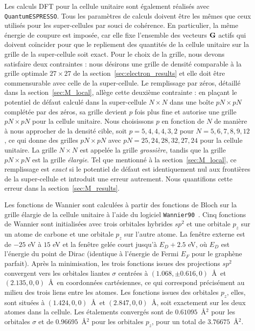 Les calculs DFT pour la cellule unitaire sont également réalisés avec \texttt{QuantumESPRESSO}. Tous les paramètres de calculs doivent être les mêmes que ceux utilisés pour les super-cellules par souci de cohérence. En particulier, la même énergie de coupure est imposée, car elle fixe l'ensemble des vecteurs $\mathbf{G}$ actifs qui doivent coïncider pour que le repliement des quantités de la cellule unitaire sur la grille de la super-cellule soit exact. Pour le choix de la grille, nous devons satisfaire deux contraintes : nous désirons une grille de densité comparable à la grille optimale $27\times27$ de la section~\ref{sec:electron_results} et elle doit être commensurable avec celle de la super-cellule. Le remplissage par zéros, détaillé dans la section~\ref{sec:M_local}, allège cette deuxième contrainte : en
plaçant le potentiel de défaut calculé dans la super-cellule
$N\times N$ dans une boîte $pN\times pN$ complétée par des zéros, sa grille devient $p$ fois plus fine et autorise une grille $pN\times pN$ pour la cellule unitaire. Nous
choisissons $p$ en fonction de $N$ de manière à nous
approcher de la densité cible, soit $p = 5, 4, 4, 4, 3, 2$ pour $N = 5, 6, 7, 8, 9, 12$, ce qui donne des grilles $pN\times pN$ avec $pN = 25, 24, 28, 32, 27, 24$ pour la cellule unitaire. La grille $N\times N$ est appelée la grille \textit{grossière}, tandis que la grille $pN\times pN$ est la grille \textit{élargie}. Tel que mentionné à la section~\ref{sec:M_local}, ce remplissage est \textit{exact} si le potentiel de défaut est identiquement nul aux frontières de la super-cellule et introduit une erreur autrement. Nous quantifions cette erreur dans la section~\ref{sec:M_results}.


Les fonctions de Wannier sont calculées à partir des fonctions de Bloch sur la grille élargie de la cellule unitaire à l'aide du logiciel \texttt{Wannier90}~\cite{mostofiWannier90ToolObtaining2008,mostofiUpdatedVersionWannier902014,pizziWannier90CommunityCode2020}. Cinq fonctions de Wannier sont initialisées avec trois orbitales hybrides $sp^2$ et une orbitale $p_z$ sur un atome de carbone et une orbitale $p_z$ sur l'autre atome. La fenêtre externe est de $-25$ eV à $15$ eV et la fenêtre gelée court jusqu'à $E_D +2.5$ eV, où $E_D$ est l'énergie du point de Dirac (identique à l'énergie de Fermi $E_F$ pour le graphène parfait). Après la minimisation, les trois fonctions issues des projections $sp^2$ convergent vers les orbitales liantes $\sigma$ centrées à $(1.068, \pm0.616, 0)$~\AA~et $(2.135, 0, 0)$~\AA~en coordonnées cartésiennes, ce qui correspond précisément au milieu des trois liens entre les atomes. Les fonctions issues des orbitales $p_z$, elles, sont situées à $(1.424, 0, 0)$~\AA~et $(2.847, 0, 0)$~\AA, soit exactement sur les deux atomes dans la cellule. Les étalements convergés sont de $0.61095$~\AA$^2$ pour les orbitales $\sigma$ et de $0.96695$~\AA$^2$ pour les orbitales $p_z$, pour un total de $3.76675$~\AA$^2$.

